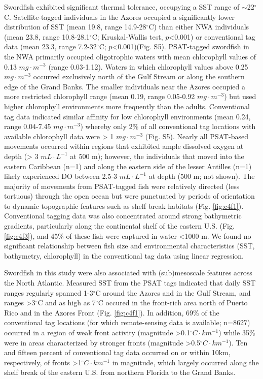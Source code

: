 Swordfish exhibited significant thermal tolerance, occupying a SST range of $\sim$22$^{\circ}$C. Satellite-tagged individuals in the Azores occupied a significantly lower distribution of SST (mean 19.8, range 14.9-28$^{\circ}$C) than either NWA individuals (mean 23.8, range 10.8-28.1$^{\circ}$C; Kruskal-Wallis test, \(p\)<0.001) or conventional tag data (mean 23.3, range 7.2-32$^{\circ}$C; \(p\)<0.001)(Fig. S5). PSAT-tagged swordfish in the NWA primarily occupied oligotrophic waters with mean chlorophyll values of 0.13 \(mg \cdot m^{-3}\) (range 0.03-1.12). Waters in which chlorophyll values above 0.25 \(mg \cdot m^{-3}\) occurred exclusively north of the Gulf Stream or along the southern edge of the Grand Banks. The smaller individuals near the Azores occupied a more restricted chlorophyll range (mean 0.19, range 0.05-0.92 \(mg \cdot m^{-3}\)) but used higher chlorophyll environments more frequently than the adults. Conventional tag data indicated similar affinity for low chlorophyll environments (mean 0.24, range 0.04-7.45 $mg \cdot m^{-3}$) whereby only 2\% of all conventional tag locations with available chlorophyll data were > 1 \(mg \cdot m^{-3}\) (Fig. S5). Nearly all PSAT-based movements occurred within regions that exhibited ample dissolved oxygen at depth (> 3 \(mL \cdot L^{-1}\) at 500 m); however, the individuals that moved into the eastern Caribbean (n=1) and along the eastern side of the lesser Antilles (n=1) likely experienced DO between 2.5-3 \(mL \cdot L^{-1}\) at depth (500 m; not shown). The majority of movements from PSAT-tagged fish were relatively directed (\eg less tortuous) through the open ocean but were punctuated by periods of orientation to dynamic topographic features such as shelf break habitats (Fig. \ref{fig:c4f1}). Conventional tagging data was also concentrated around strong bathymetric gradients, particularly along the continental shelf of the eastern U.S. (Fig. \ref{fig:c4f3}), and 45\% of these fish were captured in water <1000 m. We found no significant relationship between fish size and environmental characteristics (SST, bathymetry, chlorophyll) in the conventional tag data using linear regression.

Swordfish in this study were also associated with (sub)mesoscale features across the North Atlantic. Measured SST from the PSAT tags indicated that daily SST ranges regularly spanned 1-3$^{\circ}$C around the Azores and in the Gulf Stream, and ranges >3$^{\circ}$C and as high as 7$^{\circ}$C occured in the front-rich area north of Puerto Rico and in the Azores Front (Fig. \ref{fig:c4f1}). In addition, 69\% of the conventional tag locations (for which remote-sensing data is available; n=8627) occurred in a region of weak front activity (magnitude >0.1$^{\circ}C \cdot km ^{-1}$) while 35\% were in areas characterized by stronger fronts (magnitude >0.5$^{\circ}C \cdot km ^{-1}$). Ten and fifteen percent of conventional tag data occurred on or within 10km, respectively, of fronts >1$^{\circ}C \cdot km ^{-1}$ in magnitude, which largely occurred along the shelf break of the eastern U.S. from northern Florida to the Grand Banks.

